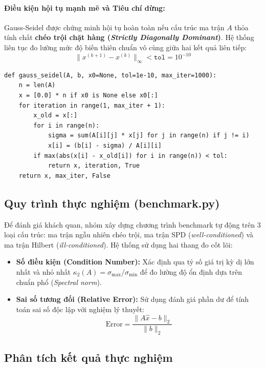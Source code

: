 \documentclass[a4paper,12pt]{article}
\begin{document}
\paragraph{Điều kiện hội tụ mạnh mẽ và Tiêu chí dừng:}
Gauss-Seidel được chứng minh hội tụ hoàn toàn nếu cấu trúc ma trận $A$ thỏa tính chất \textbf{chéo trội chặt hàng (\textit{Strictly Diagonally Dominant})}. Hệ thống liên tục đo lường mức độ biến thiên chuẩn vô cùng giữa hai kết quả liên tiếp: 
\begin{equation}
    \|x^{(k+1)} - x^{(k)}\|_\infty < \texttt{tol} = 10^{-10}
\end{equation}

\begin{lstlisting}[caption={Trien khai Gauss-Seidel in-place update}]
def gauss_seidel(A, b, x0=None, tol=1e-10, max_iter=1000):
    n = len(A)
    x = [0.0] * n if x0 is None else x0[:]
    for iteration in range(1, max_iter + 1):
        x_old = x[:]
        for i in range(n):
            sigma = sum(A[i][j] * x[j] for j in range(n) if j != i)
            x[i] = (b[i] - sigma) / A[i][i]
        if max(abs(x[i] - x_old[i]) for i in range(n)) < tol:
            return x, iteration, True
    return x, max_iter, False
\end{lstlisting}

\subsection{Quy trình thực nghiệm (benchmark.py)}
Để đánh giá khách quan, nhóm xây dựng chương trình benchmark tự động trên 3 loại cấu trúc: ma trận ngẫu nhiên chéo trội, ma trận SPD (\textit{well-conditioned}) và ma trận Hilbert (\textit{ill-conditioned}). Hệ thống sử dụng hai thang đo cốt lõi:

\begin{itemize}
    \item \textbf{Số điều kiện (Condition Number):} Xác định qua tỷ số giá trị kỳ dị lớn nhất và nhỏ nhất $\kappa_2(A) = \sigma_{\max}/\sigma_{\min}$ để đo lường độ ổn định dựa trên chuẩn phổ (\textit{Spectral norm}).
    \item \textbf{Sai số tương đối (Relative Error):} Sử dụng đánh giá phần dư để tính toán sai số độc lập với nghiệm lý thuyết:
    \begin{equation}
        \text{Error} = \frac{\|A\hat{x} - b\|_2}{\|b\|_2}
    \end{equation}
\end{itemize}

\subsection{Phân tích kết quả thực nghiệm}
\end{document}
